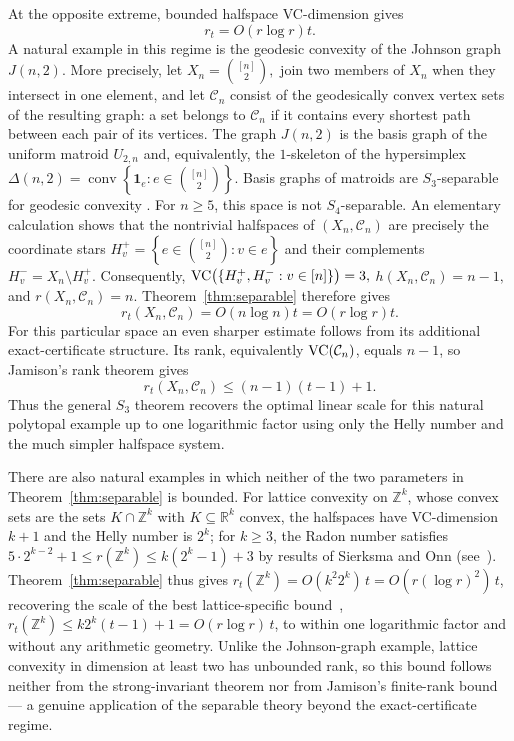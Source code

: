 \documentclass[11pt]{article}
\theoremstyle{definition}
\newcommand{\C}{\mathcal{C}}
\newcommand{\conv}{\operatorname{conv}}
\renewcommand{\Re}{\mathbb{R}}
\newcommand{\VC}{\textup{VC}}
\begin{document}
At the opposite extreme, bounded halfspace VC-dimension gives
\[
r_t=O(r\log r)t.
\]
A natural example in this regime is the geodesic convexity of the
Johnson graph $J(n,2)$. More precisely, let
$X_n=\binom{[n]}2,$
join two members of $X_n$ when they intersect in one element, and let
$\C_n$ consist of the geodesically convex vertex sets of the resulting
graph: a set belongs to $\C_n$ if it contains every shortest path
between each pair of its vertices. The graph $J(n,2)$ is the basis
graph of the uniform matroid $U_{2,n}$ and, equivalently, the
$1$-skeleton of the hypersimplex
$\Delta(n,2)
 =
\conv\left\{\mathbf 1_e:e\in\binom{[n]}2\right\}.$
Basis graphs of matroids are $S_3$-separable for geodesic convexity
\cite{chepoi2024separation}. For $n\ge5$, this space is not
$S_4$-separable. An elementary calculation shows that the nontrivial halfspaces of
$(X_n,\C_n)$ are precisely the coordinate stars
$H_v^+
 =
\left\{
e\in\binom{[n]}2:v\in e
\right\}$
and their complements $H_v^-=X_n\setminus H_v^+$. Consequently,
$\VC\bigl(\{H_v^+,H_v^-:v\in[n]\}\bigr)=3,$
$h(X_n,\C_n)=n-1,$
and 
$r(X_n,\C_n)=n.$
Theorem~\ref{thm:separable} therefore gives
\[
r_t(X_n,\C_n)
 =
O(n\log n)t
 =
O(r\log r)t.
\]
For this particular space an even sharper estimate follows from its
additional exact-certificate structure. Its rank, equivalently
$\VC(\C_n)$, equals $n-1$, so Jamison's rank theorem
\cite{jamison1981partition} gives
\[
r_t(X_n,\C_n)\le (n-1)(t-1)+1.
\]
Thus the general $S_3$ theorem recovers the optimal linear scale for
this natural polytopal example up to one logarithmic factor using only
the Helly number and the much simpler halfspace system.

There are also natural examples in which neither of the two parameters
in Theorem~\ref{thm:separable} is bounded. For lattice convexity on
$\mathbb Z^k$, whose convex sets are the sets
$K\cap\mathbb Z^k$ with $K\subseteq\Re^k$ convex, the halfspaces have
VC-dimension $k+1$ and the Helly number is $2^k$; for $k\ge3$, the
Radon number satisfies
$5\cdot2^{k-2}+1\le r(\mathbb Z^k)\le k(2^k-1)+3$ by results of
Sierksma and Onn (see~\cite{holmsen2024helly}). Theorem~\ref{thm:separable}
thus gives $r_t(\mathbb Z^k)=O(k^2 2^k)\,t=O(r(\log r)^2)\,t$,
recovering the scale of the best lattice-specific
bound~\cite{deLoeraEtAl2017QuantitativeTverberg},
$r_t(\mathbb Z^k)\le k2^k(t-1)+1=O(r\log r)\,t$, to within one
logarithmic factor and without any arithmetic geometry. Unlike the
Johnson-graph example, lattice convexity in dimension at least two has
unbounded rank, so this bound follows neither from the strong-invariant
theorem nor from Jamison's finite-rank bound --- a genuine application
of the separable theory beyond the exact-certificate regime.
\end{document}
